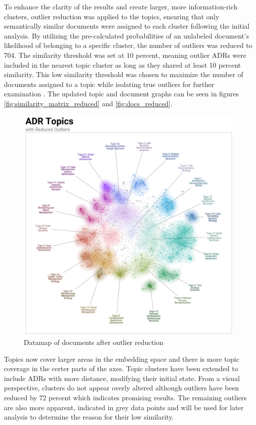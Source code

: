         To enhance the clarity of the results and create larger, more information-rich clusters, outlier reduction was applied to the topics, ensuring that only semantically similar documents were assigned to each cluster following the initial analysis. By utilizing the pre-calculated probabilities of an unlabeled document's likelihood of belonging to a specific cluster, the number of outliers was reduced to 704. The similarity threshold was set at 10 percent, meaning outlier ADRs were included in the nearest topic cluster as long as they shared at least 10 percent similarity. This low similarity threshold was chosen to maximize the number of documents assigned to a topic while isolating true outliers for further examination . The updated topic and document graphs can be seen in figures \ref{fig:similarity_matrix_reduced} and \ref{fig:docs_reduced}. 
        
        \begin{figure}[ht]
            \centering
            \includegraphics[scale=0.4]{figures/BerTopic_Reduced/datamap_reduced_outliers.png}
            \caption{Datamap of documents after outlier reduction}
            \label{fig:datamap_reduced}
        \end{figure}
        
        Topics now cover larger areas in the embedding space and there is more topic coverage in the certer parts of the axes. Topic clusters have been extended to include ADRs with more distance, modifying their initial state. From a visual perspective, clusters do not appear overly altered although outliers have been reduced by 72 percent which indicates promising results. The remaining outliers are also more apparent, indicated in grey data points and will be used for later analysis to determine the reason for their low similarity.

